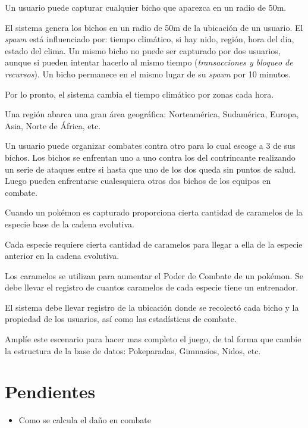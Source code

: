 \documentclass[
  letterpaper,
  DIV=11,
  numbers=noendperiod]{scrreprt}
\providecommand{\tightlist}{%
  \setlength{\itemsep}{0pt}\setlength{\parskip}{0pt}}\usepackage{longtable,booktabs,array}
\begin{document}
Un usuario puede capturar cualquier bicho que aparezca en un radio de
50m.

El sistema genera los bichos en un radio de 50m de la ubicación de un
usuario. El \emph{spawn} está influenciado por: tiempo climático, si hay
nido, región, hora del dia, estado del clima. Un mismo bicho no puede
ser capturado por dos usuarios, aunque si pueden intentar hacerlo al
mismo tiempo (\emph{transacciones y bloqueo de recursos}). Un bicho
permanece en el mismo lugar de su \emph{spawn} por 10 minutos.

Por lo pronto, el sistema cambia el tiempo climático por zonas cada
hora.

Una región abarca una gran área geográfica: Norteamérica, Sudamérica,
Europa, Asia, Norte de África, etc.

Un usuario puede organizar combates contra otro para lo cual escoge a 3
de sus bichos. Los bichos se enfrentan uno a uno contra los del
contrincante realizando un serie de ataques entre si hasta que uno de
los dos queda sin puntos de salud. Luego pueden enfrentarse cualesquiera
otros dos bichos de los equipos en combate.

Cuando un pokémon es capturado proporciona cierta cantidad de caramelos
de la especie base de la cadena evolutiva.

Cada especie requiere cierta cantidad de caramelos para llegar a ella de
la especie anterior en la cadena evolutiva.

Los caramelos se utilizan para aumentar el Poder de Combate de un
pokémon. Se debe llevar el registro de cuantos caramelos de cada especie
tiene un entrenador.

El sistema debe llevar registro de la ubicación donde se recolectó cada
bicho y la propiedad de los usuarios, así como las estadísticas de
combate.

Amplíe este escenario para hacer mas completo el juego, de tal forma que
cambie la estructura de la base de datos: Pokeparadas, Gimnasios, Nidos,
etc. 

\section{Pendientes}\label{pendientes}

\begin{itemize}
\tightlist
\item
  Como se calcula el daño en combate
\end{itemize}

\end{document}
